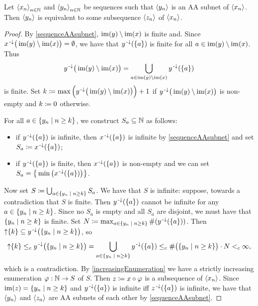 \begin{proposition} \label{sequenceAAsubnetEquivalentToSubsequence}
Let $\left\langle x_n \right\rangle_{n\in \mathbb{N}}$ and $\left\langle y_n \right\rangle_{n\in \mathbb{N}}$ be sequences such that $\left\langle y_n \right\rangle$ is an AA subnet of $\left\langle x_n \right\rangle$. Then $\left\langle y_n \right\rangle$ is equivalent to some subsequence $\left\langle z_n \right\rangle$ of $\left\langle x_n \right\rangle$.
\end{proposition}
\begin{proof}
By \ref{sequenceAAsubnet}, $\operatorname{im}(y)\setminus \operatorname{im}(x)$ is finite and. Since $x^{\text{\hspace{0.15em}-}\downarrow}\big(\operatorname{im}(y)\setminus \operatorname{im}(x)\big) = \emptyset$, we have that $y^{\text{\hspace{0.15em}-}\downarrow}(\{a\})$ is finite for all $a\in \operatorname{im}(y)\setminus \operatorname{im}(x)$. Thus
\[ y^{{\text{\hspace{0.15em}-}\downarrow}}\big(\operatorname{im}(y)\setminus \operatorname{im}(x)\big) = \bigcup_{a\in \operatorname{im}(y)\setminus \operatorname{im}(x)} y^{\text{\hspace{0.15em}-}\downarrow}(\{a\}) \]
is finite. Set $k \coloneqq \max\Big(y^{{\text{\hspace{0.15em}-}\downarrow}}\big(\operatorname{im}(y)\setminus \operatorname{im}(x)\big)\Big) + 1$ if $y^{{\text{\hspace{0.15em}-}\downarrow}}\big(\operatorname{im}(y)\setminus \operatorname{im}(x)\big)$ is non-empty and $k\coloneqq 0$ otherwise.

For all $a\in \setbuilder{y_n}{n\geq k}$, we construct $S_a\subseteq \mathbb{N}$ as follows:
\begin{itemize}
\item if $y^{\text{\hspace{0.15em}-}\downarrow}(\{a\})$ is infinite, then $x^{\text{\hspace{0.15em}-}\downarrow}(\{a\})$ is infinite by \ref{sequenceAAsubnet} and set $S_a \coloneqq x^{\text{\hspace{0.15em}-}\downarrow}(\{a\})$;
\item if $y^{\text{\hspace{0.15em}-}\downarrow}(\{a\})$ is finite, then $x^{\text{\hspace{0.15em}-}\downarrow}(\{a\})$ is non-empty and we can set $S_a = \big\{\min\big(x^{\text{\hspace{0.15em}-}\downarrow}(\{a\})\big)\big\}$.
\end{itemize}
Now set $S \defeq \bigcup_{a\in \setbuilder{y_n}{n\geq k}}S_a$. We have that $S$ is infinite: suppose, towards a contradiction that $S$ is finite. Then $y^{\text{\hspace{0.15em}-}\downarrow}(\{a\})$ cannot be infinite for any $a\in \setbuilder{y_n}{n\geq k}$. Since no $S_a$ is empty and all $S_a$ are disjoint, we must have that $\setbuilder{y_n}{n\geq k}$ is finite. Set $N \defeq \max_{a\in \setbuilder{y_n}{n\geq k}}\#(y^\preimf(\{a\}))$. Then $\upset\{k\} \subseteq y^\preimf\big(\setbuilder{y_n}{n\geq k}\big)$, so
\[ \upset\{k\} \leq_c y^\preimf\big(\setbuilder{y_n}{n\geq k}\big) = \bigcup_{a\in \setbuilder{y_n}{n\geq k}}y^\preimf(\{a\}) \leq_c \#\big(\setbuilder{y_n}{n\geq k}\big)\cdot N <_c \infty, \]
which is a contradiction. By \ref{increasingEnumeration} we have a strictly increasing enumeration $\varphi: \mathbb{N}\to S$ of $S$. Then $z \coloneqq x\circ\varphi$ is a subsequence of $\left\langle x_n \right\rangle$. Since $\im(z) = \setbuilder{y_n}{n\geq k}$ and $y^{\text{\hspace{0.15em}-}\downarrow}(\{a\})$ is infinite iff $z^{\text{\hspace{0.15em}-}\downarrow}(\{a\})$ is infinite, we have that $\left\langle y_n \right\rangle$ and $\left\langle z_n \right\rangle$ are AA subnets of each other by 
\ref{sequenceAAsubnet}.
\end{proof}

